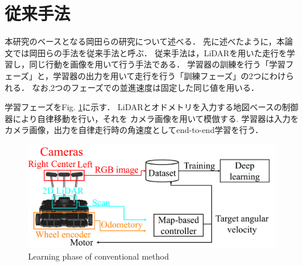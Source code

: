 \section{従来手法}
本研究のベースとなる岡田らの研究について述べる．
先に述べたように，本論文では岡田らの手法を従来手法と呼ぶ．
従来手法は，LiDARを用いた走行を学習し，同じ行動を画像を用いて行う手法である．
学習器の訓練を行う「学習フェーズ」と，学習器の出力を用いて走行を行う「訓練フェーズ」の2つにわけられる．
なお,2つのフェーズでの並進速度は固定した同じ値を用いる．

学習フェーズをFig. \ref{fig::okada_method_ler}に示す．
LiDARとオドメトリを入力する地図ベースの制御器により自律移動を行い，それを
カメラ画像を用いて模倣する.
学習器は入力をカメラ画像，出力を自律走行時の角速度としてend-to-end学習を行う．
\begin{figure}[h]
    \centering
    \includegraphics[width = 12cm]{./figs/system_learning_okada.pdf}
    \caption{Learning phase of conventional method}
    \label{fig::okada_method_ler}
\end{figure}

